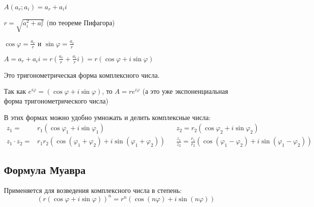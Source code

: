 \documentclass[class=article,a4paper,12pt,crop=false]{standalone}
\begin{document}
$A(a_r; a_i) = a_r + a_ii$

$r = \sqrt{a_i^2 + a_r^2}$ (по теореме Пифагора)

$\cos{\varphi} = \frac{a_r}{r}$ и $\sin{\varphi} = \frac{a_i}{r}$

$A = a_r + a_ii = r(\frac{a_r}{r} + \frac{a_i}{r}i) = r(\cos{\varphi} + i\sin\varphi)$

Это тригонометрическая форма комплексного числа.

Так как $e^{i\varphi} = (\cos{\varphi} + i\sin{\varphi})$, то $A = re^{i\varphi}$ (а это уже экспоненциальная форма тригонометрического числа)

В этих формах можно удобно умножать и делить комплексные числа:
\begin{equation}
    \begin{aligned}
        z_1 =& r_1(\cos{\varphi_1} + i\sin{\varphi_1}) & & z_2 = r_2(\cos{\varphi_2} + i\sin{\varphi_2}) \\
        z_1\cdot{z_2} =& r_1r_2(\cos{(\varphi_1 + \varphi_2)} + i\sin{(\varphi_1 + \varphi_2)}) & &
        \frac{z_1}{z_2} = \frac{r_1}{r_2}(\cos{(\varphi_1 - \varphi_2)} + i\sin{(\varphi_1 - \varphi_2)})
    \end{aligned}
\end{equation}

\subsection{Формула Муавра}

Применяется для возведения комплексного числа в степень:
\begin{equation}
    (r(\cos{\varphi} + i\sin{\varphi}))^n = r^n(\cos{(n\varphi) + i\sin{(n\varphi)}})
\end{equation}
\end{document}
